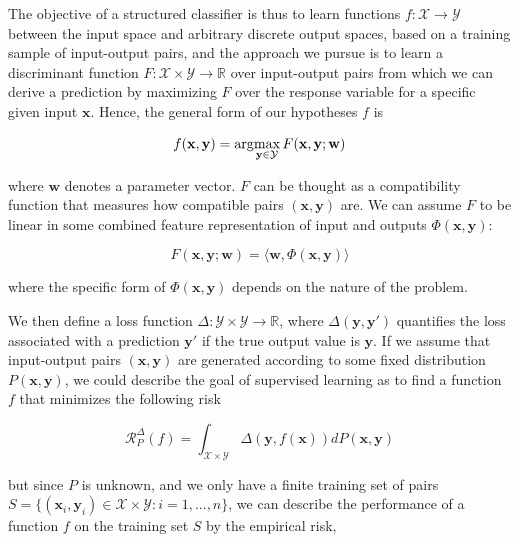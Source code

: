 The objective of a structured classifier is thus to learn functions $f:\mathcal{X}\rightarrow\mathit{\mathcal{Y}}$
between the input space and arbitrary discrete output spaces, based
on a training sample of input-output pairs, and the approach we pursue
is to learn a discriminant function $F:\mathcal{X}\times\mathit{\mathcal{Y}\rightarrow\mathbb{R}}$
over input-output pairs from which we can derive a prediction by maximizing
$F$ over the response variable for a specific given input $\mathbf{x}$. Hence, the general form of our hypotheses $f$ is

\begin{equation}
f(\mathbf{x},\mathbf{y}) =\arg\!\max_{\mathbf{y} \in \mathcal{Y}} F(\mathbf{x},\mathbf{y};\mathbf{w})
\end{equation}

where $\mathbf{w}$ denotes a parameter vector. $F$ can be thought as a compatibility function that measures how compatible pairs $(\mathbf{x},\mathbf{y})$ are. We can assume $F$ to be linear in some combined feature representation of input and outputs $\Phi(\mathbf{x},\mathbf{y})$:

\begin{equation}
F(\mathbf{x},\mathbf{y};\mathbf{w}) = \langle \mathbf{w}, \Phi(\mathbf{x},\mathbf{y}) \rangle
\end{equation}

where the specific form of $\Phi(\mathbf{x},\mathbf{y})$ depends on the nature of the problem.

We then define a loss function $\Delta : \mathcal{Y} \times \mathcal{Y} \rightarrow \mathbb{R}$, where $\Delta(\mathbf{y},\mathbf{y'})$ quantifies the loss associated with a prediction $\mathbf{y'}$ if the true output value is $\mathbf{y}$. If we assume that input-output pairs $(\mathbf{x},\mathbf{y})$ are generated according to some fixed distribution $P(\mathbf{x},\mathbf{y})$, we could describe the goal of supervised learning as to find a function $f$ that minimizes the following risk

\begin{equation}
\mathcal{R}^\Delta_P(f) = \int_{\mathcal{X} \times \mathcal{Y}} \Delta(\mathbf{y},f(\mathbf{x})) dP(\mathbf{x},\mathbf{y})
\end{equation}

but since $P$ is unknown, and we only have a finite training set of pairs $S = \{ (\mathbf{x}_i,\mathbf{y}_i) \in \mathcal{X}\times\mathcal{Y} : i=1,...,n\}$, we can describe the performance of a function $f$ on the training set $S$ by the empirical risk,

